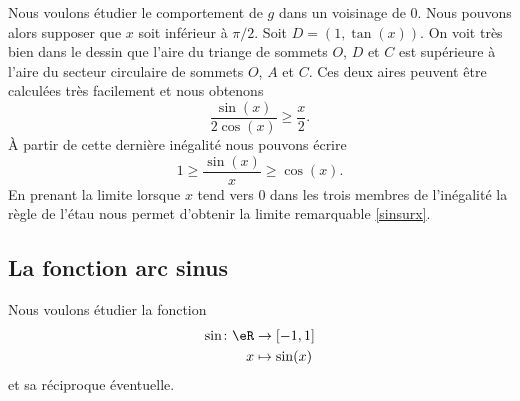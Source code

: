 \begin{description}
Nous voulons étudier le comportement de $g$ dans un voisinage de $0$. Nous pouvons alors supposer que $x$ soit inférieur à $\pi/2$. Soit $D = (1, \tan (x))$. On voit très bien dans le dessin que l'aire du triange de sommets $O$, $D$ et $C$ est supérieure à l'aire du secteur circulaire de sommets $O$, $A$ et $C$. Ces deux aires peuvent \^etre calculées très facilement et nous obtenons
\begin{equation*}
  \frac{\sin(x)}{2\cos(x)} \geq \frac{x}{2}.
\end{equation*}
À partir de cette dernière inégalité nous pouvons écrire 
\begin{equation*}
  1\geq \frac{\sin(x)}{x}\geq \cos(x).
\end{equation*}
En prenant la limite lorsque $x$ tend vers $0$ dans les trois membres de l'inégalité la règle de l'étau nous permet d'obtenir la limite remarquable  \eqref{sinsurx}. 
\end{description}

\subsection{La fonction arc sinus}

Nous voulons étudier la fonction
\begin{equation}
    \begin{aligned}
        \sin\colon \eR&\to \mathopen[ -1 , 1 \mathclose] \\
        x&\mapsto \sin(x) 
    \end{aligned}
\end{equation}
et sa réciproque éventuelle.

